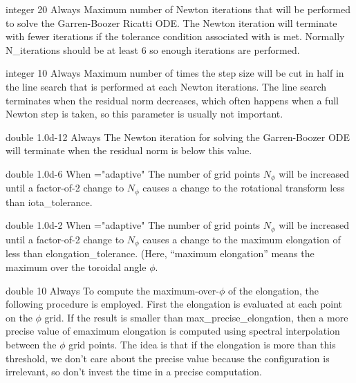 \myhrule

{integer}
{20}
{Always}
{Maximum number of Newton iterations that will be performed to solve the Garren-Boozer Ricatti ODE.  The Newton iteration will terminate with fewer iterations if the tolerance condition associated with  is met. Normally {\ttfamily N\_iterations} should be at least 6 so enough iterations are performed.}

\myhrule

{integer}
{10}
{Always}
{Maximum number of times the step size will be cut in half in the line search that is performed at each Newton iterations. The line search terminates when the residual norm decreases, which often happens when a full Newton step is taken, so this parameter is usually not important.}

\myhrule

{double}
{1.0d-12}
{Always}
{The Newton iteration for solving the Garren-Boozer ODE will terminate when the residual norm is below this value.}

\myhrule

{double}
{1.0d-6}
{When ={\ttfamily "adaptive"}}
{The number of grid points $N_\phi$ will be increased until a factor-of-2 change to $N_\phi$ causes a change to the rotational transform less than {\ttfamily iota\_tolerance}.}

\myhrule

{double}
{1.0d-2}
{When ={\ttfamily "adaptive"}}
{The number of grid points $N_\phi$ will be increased until a factor-of-2 change to $N_\phi$ causes a change to the maximum elongation of less than {\ttfamily elongation\_tolerance}. (Here, ``maximum elongation'' means the maximum over the toroidal angle $\phi$.}

\myhrule

{double}
{10}
{Always}
{To compute the maximum-over-$\phi$ of the elongation, the following procedure is employed. First the elongation is evaluated at each point on the $\phi$ grid. If the result is smaller than {\ttfamily max\_precise\_elongation}, then a more precise value of emaximum elongation is computed using spectral interpolation between the $\phi$ grid points. The idea is that if the elongation is more than this threshold, we don't care about the precise value because the configuration is irrelevant, so don't invest the time in a precise computation.}

\myhrule


